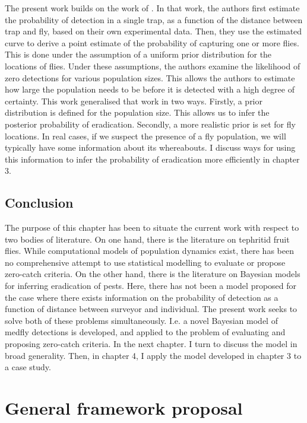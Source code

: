\documentclass[
  oneside]{book}
\begin{document}
The present work builds on the work of \citet{lance1994}. In that work, the authors first estimate the probability of detection in a single trap, as a function of the distance between trap and fly, based on their own experimental data. Then, they use the estimated curve to derive a point estimate of the probability of capturing one or more flies. This is done under the assumption of a uniform prior distribution for the locations of flies. Under these assumptions, the authors examine the likelihood of zero detections for various population sizes. This allows the authors to estimate how large the population needs to be before it is detected with a high degree of certainty. This work generalised that work in two ways. Firstly, a prior distribution is defined for the population size. This allows us to infer the posterior probability of eradication. Secondly, a more realistic prior is set for fly locations. In real cases, if we suspect the presence of a fly population, we will typically have some information about its whereabouts. I discuss ways for using this information to infer the probability of eradication more efficiently in chapter 3.

\hypertarget{conclusion}{%
\section{Conclusion}\label{conclusion}}

The purpose of this chapter has been to situate the current work with respect to two bodies of literature. On one hand, there is the literature on tephritid fruit flies. While computational models of population dynamics exist, there has been no comprehensive attempt to use statistical modelling to evaluate or propose zero-catch criteria. On the other hand, there is the literature on Bayesian models for inferring eradication of pests. Here, there has not been a model proposed for the case where there exists information on the probability of detection as a function of distance between surveyor and individual. The present work seeks to solve both of these problems simultaneously. I.e. a novel Bayesian model of medfly detections is developed, and applied to the problem of evaluating and proposing zero-catch criteria. In the next chapter. I turn to discuss the model in broad generality. Then, in chapter 4, I apply the model developed in chapter 3 to a case study.

\hypertarget{ch3}{%
\chapter{General framework proposal}\label{ch3}}
\end{document}
